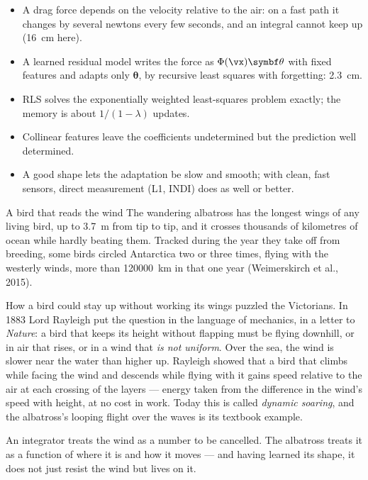 \begin{remember}
\begin{itemize}
  \item A drag force depends on the velocity relative to the air: on a fast path it changes by several newtons every few seconds, and an integral cannot keep up (\SI{16}{cm} here).
  \item A learned residual model writes the force as $\Phi(\vx)\symbf\theta$ with fixed features and adapts only $\symbf\theta$, by recursive least squares with forgetting: \SI{2.3}{cm}.
  \item RLS solves the exponentially weighted least-squares problem exactly; the memory is about $1/(1 - \lambda)$ updates.
  \item Collinear features leave the coefficients undetermined but the prediction well determined.
  \item A good shape lets the adaptation be slow and smooth; with clean, fast sensors, direct measurement (L1, INDI) does as well or better.
\end{itemize}
\end{remember}

\begin{curiosity}{A bird that reads the wind}
The wandering albatross has the longest wings of any living bird, up to \SI{3.7}{m} from tip to tip, and it crosses thousands of kilometres of ocean while hardly beating them. Tracked during the year they take off from breeding, some birds circled Antarctica two or three times, flying with the westerly winds, more than \num{120000}~km in that one year (Weimerskirch et al., 2015).

How a bird could stay up without working its wings puzzled the Victorians. In 1883 Lord Rayleigh put the question in the language of mechanics, in a letter to \emph{Nature}: a bird that keeps its height without flapping must be flying downhill, or in air that rises, or in a wind that \emph{is not uniform}. Over the sea, the wind is slower near the water than higher up. Rayleigh showed that a bird that climbs while facing the wind and descends while flying with it gains speed relative to the air at each crossing of the layers — energy taken from the difference in the wind's speed with height, at no cost in work. Today this is called \emph{dynamic soaring}, and the albatross's looping flight over the waves is its textbook example.

An integrator treats the wind as a number to be cancelled. The albatross treats it as a function of where it is and how it moves — and having learned its shape, it does not just resist the wind but lives on it.
\end{curiosity}

